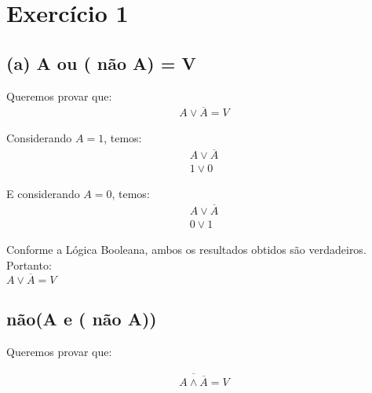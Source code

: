 \section{Exercício 1} 

\subsection*{(a) A ou ( não A) = V}

Queremos provar que: \\

\begin{eqnarray}
A \vee \overline{A} = V
\end{eqnarray}

\noindent
Considerando $A = 1$, temos: \\

\begin{eqnarray}
A \vee \overline{A} \\
1 \vee 0
\end{eqnarray}

E considerando $A = 0$, temos: \\

\begin{eqnarray}
A \vee \overline{A} \\
0 \vee 1
\end{eqnarray}

Conforme a Lógica Booleana, ambos os resultados obtidos são verdadeiros. \\

Portanto:\\


$A \vee \overline{A} = V$ \\


\subsection*{não(A e ( não A))}

Queremos provar que:

\begin{eqnarray}
\overline{A \wedge \overline{A}} = V
\end{eqnarray}


